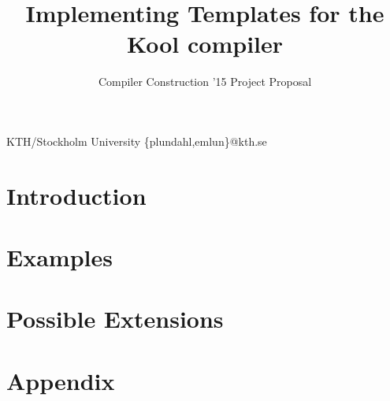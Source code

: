 \documentclass[nocopyrightspace,11pt,authoryear,preprint]{sigplanconf}
\begin{document}


\title{Implementing Templates for the Kool compiler}
\subtitle{Compiler Construction '15 Project Proposal}

           {KTH/Stockholm University}
           {\{plundahl,emlun\}@kth.se}

\maketitle

\section{Introduction}


\section{Examples}


\section{Possible Extensions}


\onecolumn
\section{Appendix}

\end{document}
